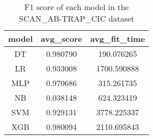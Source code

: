 \begin{table}[H]
\centering
\caption{F1 score of each model in the SCAN_AB-TRAP_CIC dataset}
\label{f1_valid_scan_ab-trap_cic}
\begin{tabular}{ccc}
\toprule
model &  avg\_score &  avg\_fit\_time \\
\midrule
   DT &   0.980790 &    190.076265 \\
   LR &   0.933008 &   1700.590888 \\
  MLP &   0.970686 &    315.261735 \\
   NB &   0.038148 &    624.323419 \\
  SVM &   0.929131 &   3778.225337 \\
  XGB &   0.980094 &   2110.695843 \\
\bottomrule
\end{tabular}
\end{table}
